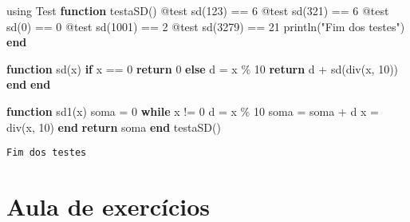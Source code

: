 \documentclass[
  letterpaper,
  DIV=11,
  numbers=noendperiod]{scrreprt}
\newenvironment{Shaded}{\begin{snugshade}}{\end{snugshade}}
\newcommand{\BuiltInTok}[1]{\textcolor[rgb]{0.00,0.23,0.31}{#1}}
\newcommand{\ControlFlowTok}[1]{\textcolor[rgb]{0.00,0.23,0.31}{\textbf{#1}}}
\newcommand{\FloatTok}[1]{\textcolor[rgb]{0.68,0.00,0.00}{#1}}
\newcommand{\FunctionTok}[1]{\textcolor[rgb]{0.28,0.35,0.67}{#1}}
\newcommand{\ImportTok}[1]{\textcolor[rgb]{0.00,0.46,0.62}{#1}}
\newcommand{\KeywordTok}[1]{\textcolor[rgb]{0.00,0.23,0.31}{\textbf{#1}}}
\newcommand{\NormalTok}[1]{\textcolor[rgb]{0.00,0.23,0.31}{#1}}
\newcommand{\OperatorTok}[1]{\textcolor[rgb]{0.37,0.37,0.37}{#1}}
\newcommand{\PreprocessorTok}[1]{\textcolor[rgb]{0.68,0.00,0.00}{#1}}
\newcommand{\StringTok}[1]{\textcolor[rgb]{0.13,0.47,0.30}{#1}}
\begin{document}
\begin{Shaded}
\begin{Highlighting}[]
\ImportTok{using} \BuiltInTok{Test}
\KeywordTok{function} \FunctionTok{testaSD}\NormalTok{()}
  \PreprocessorTok{@test} \FunctionTok{sd}\NormalTok{(}\FloatTok{123}\NormalTok{) }\OperatorTok{==} \FloatTok{6}
  \PreprocessorTok{@test} \FunctionTok{sd}\NormalTok{(}\FloatTok{321}\NormalTok{) }\OperatorTok{==} \FloatTok{6}
  \PreprocessorTok{@test} \FunctionTok{sd}\NormalTok{(}\FloatTok{0}\NormalTok{) }\OperatorTok{==} \FloatTok{0}
  \PreprocessorTok{@test} \FunctionTok{sd}\NormalTok{(}\FloatTok{1001}\NormalTok{) }\OperatorTok{==} \FloatTok{2}
  \PreprocessorTok{@test} \FunctionTok{sd}\NormalTok{(}\FloatTok{3279}\NormalTok{) }\OperatorTok{==} \FloatTok{21}
  \FunctionTok{println}\NormalTok{(}\StringTok{"Fim dos testes"}\NormalTok{)}
\KeywordTok{end}

\KeywordTok{function} \FunctionTok{sd}\NormalTok{(x)}
  \ControlFlowTok{if}\NormalTok{ x }\OperatorTok{==} \FloatTok{0}
     \ControlFlowTok{return} \FloatTok{0}
  \ControlFlowTok{else}
\NormalTok{     d }\OperatorTok{=}\NormalTok{ x }\OperatorTok{\%} \FloatTok{10}
     \ControlFlowTok{return}\NormalTok{ d }\OperatorTok{+} \FunctionTok{sd}\NormalTok{(}\FunctionTok{div}\NormalTok{(x, }\FloatTok{10}\NormalTok{))}
  \ControlFlowTok{end}
\KeywordTok{end}

\KeywordTok{function} \FunctionTok{sd1}\NormalTok{(x)}
\NormalTok{  soma }\OperatorTok{=} \FloatTok{0}
  \ControlFlowTok{while}\NormalTok{ x }\OperatorTok{!=} \FloatTok{0}
\NormalTok{   d }\OperatorTok{=}\NormalTok{ x }\OperatorTok{\%} \FloatTok{10}
\NormalTok{   soma }\OperatorTok{=}\NormalTok{ soma }\OperatorTok{+}\NormalTok{ d}
\NormalTok{   x }\OperatorTok{=} \FunctionTok{div}\NormalTok{(x, }\FloatTok{10}\NormalTok{)}
  \ControlFlowTok{end}
  \ControlFlowTok{return}\NormalTok{ soma}
\KeywordTok{end}
\FunctionTok{testaSD}\NormalTok{()}
\end{Highlighting}
\end{Shaded}

\begin{verbatim}
Fim dos testes
\end{verbatim}


\chapter{Aula de exercícios}\label{aula-de-exercuxedcios}
\end{document}
